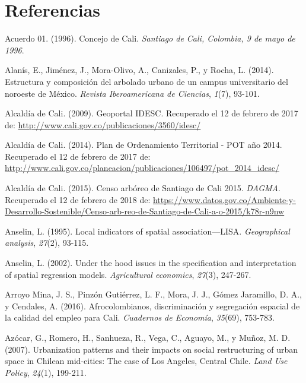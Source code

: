 \documentclass[12pt,a4paper,oneside, openany]{book}
\theoremstyle{definition}
\theoremstyle{definition}
\theoremstyle{definition}
\theoremstyle{remark}
\begin{document}
\chapter*{Referencias}\label{referencias}

\hypertarget{refs}{}
\hypertarget{ref-cc_acuerdo01_1996}{}
Acuerdo 01. (1996). Concejo de Cali. \emph{Santiago de Cali, Colombia, 9
de mayo de 1996}.

\hypertarget{ref-alanis_estructura_2014}{}
Alanís, E., Jiménez, J., Mora-Olivo, A., Canizales, P., y Rocha, L.
(2014). Estructura y composición del arbolado urbano de un campus
universitario del noroeste de México. \emph{Revista Iberoamericana de
Ciencias}, \emph{1}(7), 93-101.

\hypertarget{ref-geoportal_idesc}{}
Alcaldía de Cali. (2009). Geoportal IDESC. Recuperado el 12 de febrero
de 2017 de: \url{http://www.cali.gov.co/publicaciones/3560/idesc/}

\hypertarget{ref-pot2014cali}{}
Alcaldía de Cali. (2014). Plan de Ordenamiento Territorial - POT año
2014. Recuperado el 12 de febrero de 2017 de:
\url{http://www.cali.gov.co/planeacion/publicaciones/106497/pot_2014_idesc/}

\hypertarget{ref-ca2015cali}{}
Alcaldía de Cali. (2015). Censo arbóreo de Santiago de Cali 2015.
\emph{DAGMA}. Recuperado el 12 de febrero de 2018 de:
\url{https://www.datos.gov.co/Ambiente-y-Desarrollo-Sostenible/Censo-arb-reo-de-Santiago-de-Cali-a-o-2015/k78r-n9nw}

\hypertarget{ref-anselin1995local}{}
Anselin, L. (1995). Local indicators of spatial association---LISA.
\emph{Geographical analysis}, \emph{27}(2), 93-115.

\hypertarget{ref-anselin_under_2002}{}
Anselin, L. (2002). Under the hood issues in the specification and
interpretation of spatial regression models. \emph{Agricultural
economics}, \emph{27}(3), 247-267.

\hypertarget{ref-arroyo_mina_afrocolombianos_2016}{}
Arroyo Mina, J. S., Pinzón Gutiérrez, L. F., Mora, J. J., Gómez
Jaramillo, D. A., y Cendales, A. (2016). Afrocolombianos, discriminación
y segregación espacial de la calidad del empleo para Cali.
\emph{Cuadernos de Economía}, \emph{35}(69), 753-783.

\hypertarget{ref-azocar_urbanization_2007}{}
Azócar, G., Romero, H., Sanhueza, R., Vega, C., Aguayo, M., y Muñoz, M.
D. (2007). Urbanization patterns and their impacts on social
restructuring of urban space in Chilean mid-cities: The case of Los
Angeles, Central Chile. \emph{Land Use Policy}, \emph{24}(1), 199-211.
\end{document}
